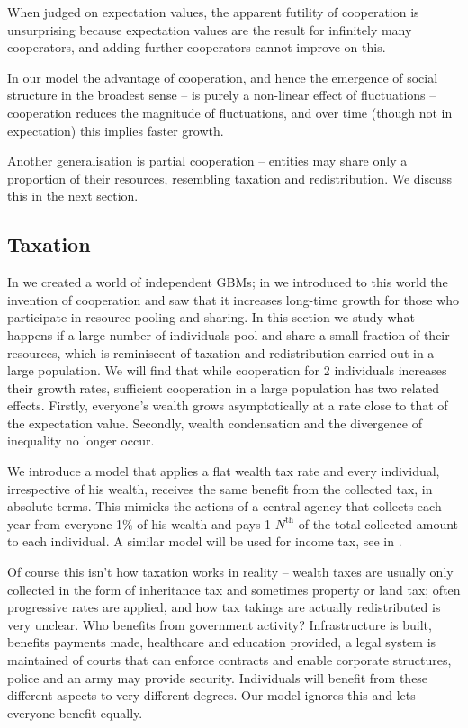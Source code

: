 When judged on expectation values, the apparent futility of cooperation is unsurprising
because expectation values are the result for infinitely 
many cooperators, and adding further cooperators cannot improve on this.

In our model the advantage of cooperation, and hence the emergence
of social structure in the broadest sense -- is purely a non-linear 
effect of fluctuations -- cooperation reduces the magnitude of 
fluctuations, and over time (though not in expectation) this implies faster growth. 


Another generalisation is partial cooperation -- entities may share only
a proportion of their resources, resembling taxation and redistribution. We discuss this in the next section.

\subsection{Taxation}
In  we created a world of independent GBMs; in  
we introduced to this world
the invention of cooperation and saw that it increases long-time growth for those who participate
in resource-pooling and sharing. In this section we study what happens if a large number
of individuals pool and share a small fraction of their resources, which is reminiscent of taxation
and redistribution carried out in a large population. We will find that while cooperation for 2 individuals
increases their growth rates, sufficient cooperation in a large population
has two related effects. Firstly, everyone's wealth grows asymptotically at a rate close to that of
the expectation value. Secondly, wealth condensation and the divergence of inequality 
no longer occur.

We introduce a model that applies a flat wealth tax rate and every individual, irrespective of his 
wealth, receives the same benefit from the collected tax, in absolute terms. This mimicks the
actions of a central agency that collects each year from everyone 1\% of his wealth and pays 
1-$N^\text{th}$ of the total collected amount to each individual. A similar model will be 
used for income tax, see  in . 

Of course this isn't how taxation works in reality -- wealth taxes are usually only collected in 
the form of inheritance tax and sometimes property or land tax; often progressive rates are 
applied, and how tax takings are actually redistributed is very unclear. 
Who benefits from government activity? Infrastructure is built, benefits payments made, 
healthcare and education provided, a legal system is maintained of courts that can 
enforce contracts and enable corporate structures, police and an army may provide security. 
Individuals will benefit from these different aspects to very different degrees. Our model 
ignores this and lets everyone benefit equally.

